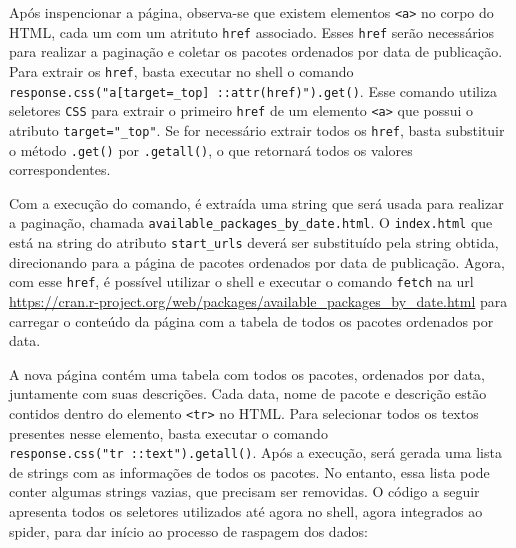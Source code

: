 \documentclass[
  12pt,
  a4paper,
]{scrreprt}
\begin{document}
Após inspencionar a página, observa-se que existem elementos
\texttt{\textless{}a\textgreater{}} no corpo do HTML, cada um com um
atrituto \texttt{href} associado. Esses \texttt{href} serão necessários
para realizar a paginação e coletar os pacotes ordenados por data de
publicação. Para extrair os \texttt{href}, basta executar no shell o
comando
\texttt{response.css("a{[}target=\_top{]}\ ::attr(href)").get()}. Esse
comando utiliza seletores \texttt{CSS} para extrair o primeiro
\texttt{href} de um elemento \texttt{\textless{}a\textgreater{}} que
possui o atributo \texttt{target="\_top"}. Se for necessário extrair
todos os \texttt{href}, basta substituir o método \texttt{.get()} por
\texttt{.getall()}, o que retornará todos os valores correspondentes.

\vspace{12pt}

Com a execução do comando, é extraída uma string que será usada para
realizar a paginação, chamada
\texttt{\textquotesingle{}available\_packages\_by\_date.html\textquotesingle{}}.
O \texttt{\textquotesingle{}index.html\textquotesingle{}} que está na
string do atributo \texttt{start\_urls} deverá ser substituído pela
string obtida, direcionando para a página de pacotes ordenados por data
de publicação. Agora, com esse \texttt{href}, é possível utilizar o
shell e executar o comando \texttt{fetch} na url
\url{https://cran.r-project.org/web/packages/available_packages_by_date.html}
para carregar o conteúdo da página com a tabela de todos os pacotes
ordenados por data.

\vspace{12pt}

A nova página contém uma tabela com todos os pacotes, ordenados por
data, juntamente com suas descrições. Cada data, nome de pacote e
descrição estão contidos dentro do elemento
\texttt{\textless{}tr\textgreater{}} no HTML. Para selecionar todos os
textos presentes nesse elemento, basta executar o comando
\texttt{response.css("tr\ ::text").getall()}. Após a execução, será
gerada uma lista de strings com as informações de todos os pacotes. No
entanto, essa lista pode conter algumas strings vazias, que precisam ser
removidas. O código a seguir apresenta todos os seletores utilizados até
agora no shell, agora integrados ao spider, para dar início ao processo
de raspagem dos dados:
\end{document}
